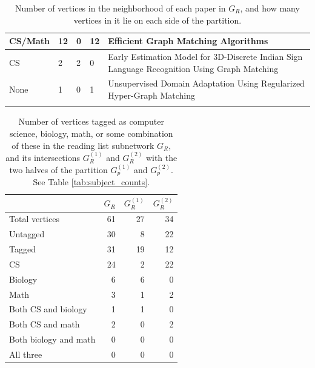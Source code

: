 \documentclass[12pt]{thesis}
\theoremstyle{plain}
\theoremstyle{definition}
\theoremstyle{remark}
\begin{document}
\begin{singlespace}
\begin{longtable}{|L{0.095\textwidth}|C{0.04\textwidth}|C{0.045\textwidth}|C{0.045\textwidth}|L{0.7\textwidth}|}
CS/Math & 12 & 0 & 12 & Efficient Graph Matching Algorithms \\ \hline
CS & 2 & 2 & 0 & Early Estimation Model for 3D-Discrete Indian Sign Language Recognition Using Graph Matching \\ \hline
None & 1 & 0 & 1 & Unsupervised Domain Adaptation Using Regularized Hyper-Graph Matching \\ \hline
\caption{Number of vertices in the neighborhood of each paper in $G_R$, and how many vertices in it lie on each side of the partition.}
\label{tab:neighborhood_partition_counts}
\end{longtable}
\end{singlespace}

\begin{table}[t]
\centering
\begin{tabular}{|l|r|r|r|}
\hline & $G_R$ & $G_R^{(1)}$ & $G_R^{(2)}$ \\ \hline
Total vertices & 61 & 27 & 34 \\ \hline
Untagged & 30 & 8 & 22 \\ \hline
Tagged & 31 & 19 & 12 \\ \hline
CS & 24 & 2 & 22 \\ \hline
Biology & 6 & 6 & 0 \\ \hline
Math & 3 & 1 & 2 \\ \hline
Both CS and biology & 1 & 1 & 0 \\ \hline
Both CS and math & 2 & 0 & 2 \\ \hline
Both biology and math & 0 & 0 & 0 \\ \hline
All three & 0 & 0 & 0 \\ \hline
\end{tabular}
\caption{Number of vertices tagged as computer science, biology, math, or some combination of these in the reading list subnetwork $G_R$, and its intersections $G_R^{(1)}$ and $G_R^{(2)}$ with the two halves of the partition $G_p^{(1)}$ and $G_p^{(2)}$. See Table \ref{tab:subject_counts}.}
\label{tab:reading_list_subject_counts}
\end{table}
\end{document}
